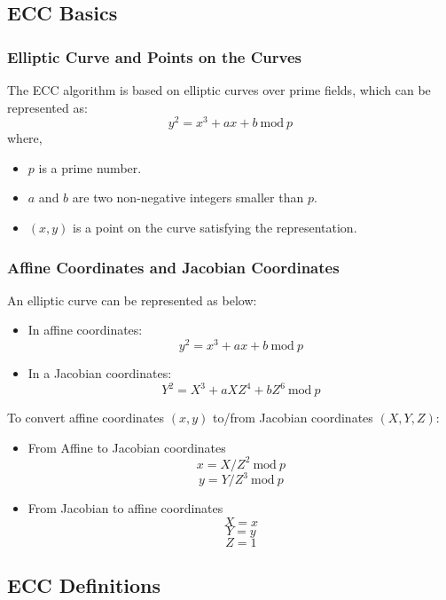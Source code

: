 \documentclass[main\_\_EN.tex]{subfiles}
\begin{document}
\subsection{ECC Basics}

\subsubsection{Elliptic Curve and Points on the Curves}
The ECC algorithm is based on elliptic curves over prime fields, which can be represented as:
\[
{y}^{2} = {x}^{3} + {ax} + b \ \textrm{mod}\ p
\]
where,
\begin{itemize}
    \item $p$ is a prime number.
    \item $a$ and $b$ are two non-negative integers smaller than $p$.
    \item $(x, y)$ is a point on the curve satisfying the representation.
\end{itemize}

\subsubsection{Affine Coordinates and Jacobian Coordinates}

An elliptic curve can be represented as below:

\begin{itemize}
    \item In affine coordinates:
    \[
    {y}^{2} = {x}^{3} + {ax} + b \ \textrm{mod}\ p
    \]
    \item In a Jacobian coordinates:
    \[
    {Y}^{2} = {X}^{3} + {aXZ}^{4} + {bZ}^{6} \ \textrm{mod}\ p
    \]
\end{itemize}

To convert affine coordinates $(x,y)$ to/from Jacobian coordinates $(X,Y,Z)$:

\begin{itemize}
    \item From Affine to Jacobian coordinates
    \[
    x = X / {Z}^2 \ \textrm{mod}\ p
    \]
    \[
    y = Y / {Z}^3 \ \textrm{mod}\ p
    \]
    \item From Jacobian to affine coordinates
    \[ X = x \]
    \[ Y = y \]
    \[ Z = 1\]
\end{itemize}

\subsection{ECC Definitions}
\end{document}
